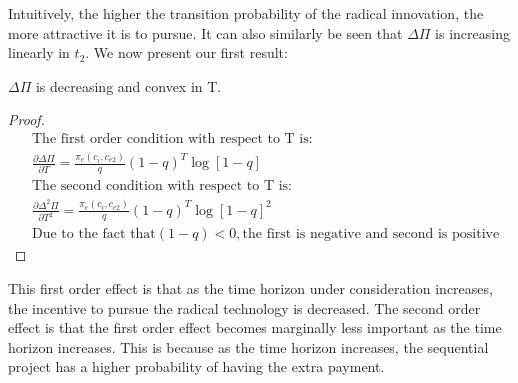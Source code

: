 Intuitively, the higher the transition probability of the radical innovation, the more attractive it is to pursue. It can also similarly be seen that $\Delta \Pi$ is increasing linearly in $t_2$. We now present our first result:  
\begin{proposition}
$\Delta \Pi$ is decreasing and convex in T.
\end{proposition}
\begin{proof}
\begin{align*}
&\text{The first order condition with respect to T is:} \\
&\frac{\partial \Delta \Pi}{\partial T}=\frac{\pi_{e}(c_i,c_{e2})}{q} (1-q)^{T} \log[1-q] \\
&\text{The second condition with respect to T is:} \\
&\frac{\partial \Delta^2 \Pi}{\partial T^2} = \frac{\pi_{e}(c_i,c_{e2})}{q} (1-q)^{T} \log[1-q]^2 \\
&\text{Due to the fact that} (1-q) <0, \text{the first is negative and second is positive}
\end{align*}
\end{proof}

This first order effect is that as the time horizon under consideration increases, the incentive to pursue the radical technology is decreased. The second order effect is that the first order effect becomes marginally less important as the time horizon increases. This is because as the time horizon increases, the sequential project has a higher probability of having the extra payment. 

